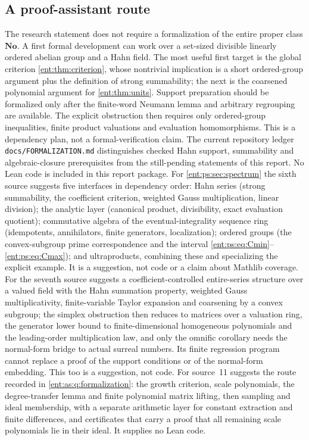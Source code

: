 \documentclass[11pt]{article}
\theoremstyle{plain}
\theoremstyle{plain}
\theoremstyle{plain}
\theoremstyle{definition}
\theoremstyle{definition}
\theoremstyle{definition}
\theoremstyle{definition}
\theoremstyle{remark}
\newcommand{\No}{\mathbf{No}}
\begin{document}
\subsection{A proof-assistant route}
The research statement does not require a formalization of the entire proper
class $\No$. A first formal development can work over a set-sized divisible
linearly ordered abelian group and a Hahn field. The most useful first target
is the global criterion \cref{ent:thm:criterion}, whose nontrivial
implication is a short ordered-group argument plus the definition of strong
summability; the next is the coarsened polynomial argument for
\cref{ent:thm:units}. Support preparation should be formalized only after the
finite-word Neumann lemma and arbitrary regrouping are available. The
explicit obstruction then requires only ordered-group inequalities, finite
product valuations and evaluation homomorphisms. This is a dependency plan,
not a formal-verification claim. The current repository ledger
\texttt{docs/FORMALIZATION.md} distinguishes checked Hahn support,
summability and algebraic-closure prerequisites from the still-pending
statements of this report. No Lean code is included in this report package.
For \cref{ent:ps:sec:spectrum} the sixth source suggests five interfaces in
dependency order: Hahn series (strong summability, the coefficient
criterion, weighted Gauss multiplication, linear division); the analytic
layer (canonical product, divisibility, exact evaluation quotient);
commutative algebra of the eventual-integrality sequence ring (idempotents,
annihilators, finite generators, localization); ordered groups (the
convex-subgroup prime correspondence and the interval
\eqref{ent:ps:eq:Cmin}--\eqref{ent:ps:eq:Cmax}); and ultraproducts, combining
these and specializing the explicit example. It is a suggestion, not code or
a claim about Mathlib coverage.
For  the seventh
source suggests a coefficient-controlled entire-series structure over a valued
field with the Hahn summation property, weighted Gauss multiplicativity,
finite-variable Taylor expansion and coarsening by a convex subgroup; the
simplex obstruction then reduces to matrices over a valuation ring, the
generator lower bound to finite-dimensional homogeneous polynomials and the
leading-order multiplication law, and only the omnific corollary needs the
normal-form bridge to actual surreal numbers. Its finite regression program
cannot replace a proof of the support conditions or of the normal-form
embedding. This too is a suggestion, not code.
For  source~11
suggests the route recorded in \cref{ent:as:q:formalization}: the growth
criterion, scale polynomials, the degree-transfer lemma and finite polynomial
matrix lifting, then sampling and ideal membership, with a separate arithmetic
layer for constant extraction and finite differences, and certificates that
carry a proof that all remaining scale polynomials lie in their ideal. It
supplies no Lean code.
\end{document}
